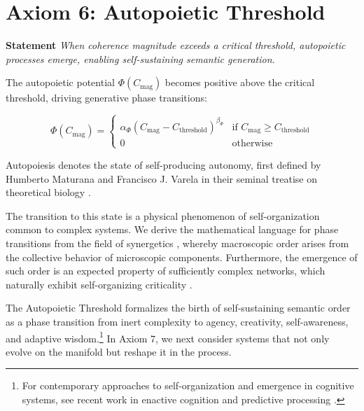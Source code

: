 
\section{Axiom 6: Autopoietic Threshold}
\label{1.6:axiom_6_autopoietic_threshold}

\textbf{Statement} \textit{When coherence magnitude exceeds a critical threshold, autopoietic processes emerge, enabling self-sustaining semantic generation.}

The autopoietic potential \(\Phi(C_{\text{mag}})\) becomes positive above the critical threshold, driving generative phase transitions:

\begin{equation}
\Phi(C_{\text{mag}}) = \begin{cases}
\alpha_{\Phi} (C_{\text{mag}} - C_{\text{threshold}})^{\beta_{\Phi}} & \text{if } C_{\text{mag}} \geq C_{\text{threshold}} \\
0 & \text{otherwise}
\end{cases}
\end{equation}

Autopoiesis denotes the state of self-producing autonomy, first defined by Humberto Maturana and Francisco J. Varela in their seminal treatise on theoretical biology \autocite{MaturanaVarela1980}.

The transition to this state is a physical phenomenon of self-organization common to complex systems. We derive the mathematical language for phase transitions from the field of synergetics \autocite{Haken1983}, whereby macroscopic order arises from the collective behavior of microscopic components. Furthermore, the emergence of such order is an expected property of sufficiently complex networks, which naturally exhibit self-organizing criticality \autocite{BakTangWiesenfeld1987}.

The Autopoietic Threshold formalizes the birth of self-sustaining semantic order as a phase transition from inert complexity to agency, creativity, self-awareness, and adaptive wisdom.\footnote{For contemporary approaches to self-organization and emergence in cognitive systems, see recent work in enactive cognition \autocite{Thompson2018, DiPaolo2021} and predictive processing \autocite{Clark2016, Hohwy2013}.} In Axiom 7, we next consider systems that not only evolve on the manifold but reshape it in the process.


